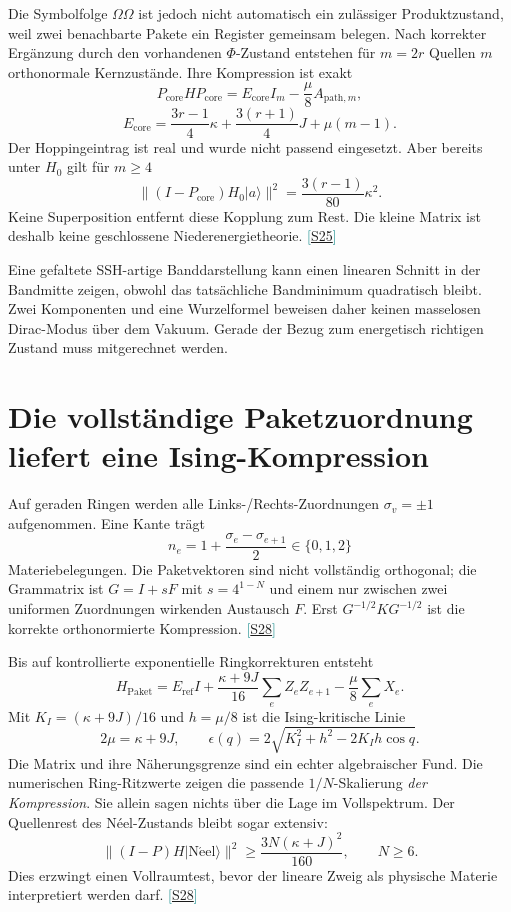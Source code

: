 \documentclass[11pt,a4paper,oneside,parskip=half,headings=normal,numbers=noenddot,bibliography=totoc]{scrreprt}
\newcommand{\ket}[1]{\lvert #1\rangle}
\newcommand{\src}[1]{\textcolor{teal}{\small[\hyperref[s:#1]{S#1}]}}
\begin{document}
Die Symbolfolge $\Omega\Omega$ ist jedoch nicht automatisch ein zulässiger Produktzustand, weil zwei benachbarte Pakete ein Register gemeinsam belegen. Nach korrekter Ergänzung durch den vorhandenen $\Phi$-Zustand entstehen für $m=2r$ Quellen $m$ orthonormale Kernzustände. Ihre Kompression ist exakt
\[
 P_{\mathrm{core}}HP_{\mathrm{core}}
 =E_{\mathrm{core}}I_m-\frac\mu8A_{\mathrm{path},m},
\]
\[
 E_{\mathrm{core}}=\frac{3r-1}{4}\kappa+\frac{3(r+1)}4J+\mu(m-1).
\]
Der Hoppingeintrag ist real und wurde nicht passend eingesetzt. Aber bereits unter $H_0$ gilt für $m\ge4$
\[
 \|(I-P_{\mathrm{core}})H_0\ket a\|^2
 =\frac{3(r-1)}{80}\kappa^2.
\]
Keine Superposition entfernt diese Kopplung zum Rest. Die kleine Matrix ist deshalb keine geschlossene Niederenergietheorie. \src{25}

Eine gefaltete SSH-artige Banddarstellung kann einen linearen Schnitt in der Bandmitte zeigen, obwohl das tatsächliche Bandminimum quadratisch bleibt. Zwei Komponenten und eine Wurzelformel beweisen daher keinen masselosen Dirac-Modus über dem Vakuum. Gerade der Bezug zum energetisch richtigen Zustand muss mitgerechnet werden.

\section{Die vollständige Paketzuordnung liefert eine Ising-Kompression}
Auf geraden Ringen werden alle Links-/Rechts-Zuordnungen $\sigma_v=\pm1$ aufgenommen. Eine Kante trägt
\[
 n_e=1+\frac{\sigma_e-\sigma_{e+1}}2\in\{0,1,2\}
\]
Materiebelegungen. Die Paketvektoren sind nicht vollständig orthogonal; die Grammatrix ist $G=I+sF$ mit $s=4^{1-N}$ und einem nur zwischen zwei uniformen Zuordnungen wirkenden Austausch $F$. Erst $G^{-1/2}KG^{-1/2}$ ist die korrekte orthonormierte Kompression. \src{28}

Bis auf kontrollierte exponentielle Ringkorrekturen entsteht
\[
 H_{\mathrm{Paket}}=E_{\mathrm{ref}}I
 +\frac{\kappa+9J}{16}\sum_e Z_eZ_{e+1}
 -\frac\mu8\sum_e X_e.
\]
Mit $K_I=(\kappa+9J)/16$ und $h=\mu/8$ ist die Ising-kritische Linie
\[
 2\mu=\kappa+9J,\qquad
 \epsilon(q)=2\sqrt{K_I^2+h^2-2K_Ih\cos q}.
\]
Die Matrix und ihre Näherungsgrenze sind ein echter algebraischer Fund. Die numerischen Ring-Ritzwerte zeigen die passende $1/N$-Skalierung \emph{der Kompression}. Sie allein sagen nichts über die Lage im Vollspektrum. Der Quellenrest des Néel-Zustands bleibt sogar extensiv:
\[
 \|(I-P)H\ket{\mathrm{N\acute eel}}\|^2
 \ge\frac{3N(\kappa+J)^2}{160},\qquad N\ge6.
\]
Dies erzwingt einen Vollraumtest, bevor der lineare Zweig als physische Materie interpretiert werden darf. \src{28}
\end{document}
